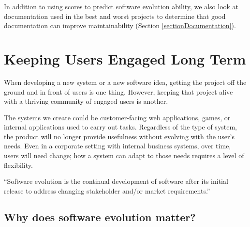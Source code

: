 \documentclass[12pt,conference]{IEEEtran}
\newcommand\todo[1]{\textcolor{red}{#1}}
\begin{document}

In addition to using scores to predict software evolution ability, we also look at documentation used in the best and worst projects to determine that good documentation can improve maintainability (Section \ref{sectionDocumentation}).


\vspace{0.5cm}
\section{Keeping Users Engaged Long Term} \label{sectionTheProblem}
\vspace{0.25cm}


When developing a new system or a new software idea, getting the project off the ground and in front of users is one thing. However, keeping that project alive with a thriving community of engaged users is another.

The systems we create could be customer-facing web applications, games, or internal applications used to carry out tasks. Regardless of the type of system, the product will no longer provide usefulness without evolving with the user's needs. Even in a corporate setting with internal business systems, over time, users will need change; how a system can adapt to those needs requires a level of flexibility.

\vspace{0.25cm}
\begin{displayquote}
``Software evolution is the continual development of software after its initial release to address changing stakeholder and/or market requirements.'' \cite{wiki:software-evolution}
\end{displayquote}
\vspace{0.25cm}

\vspace{0.25cm}
\subsection{Why does software evolution matter?}
\end{document}

